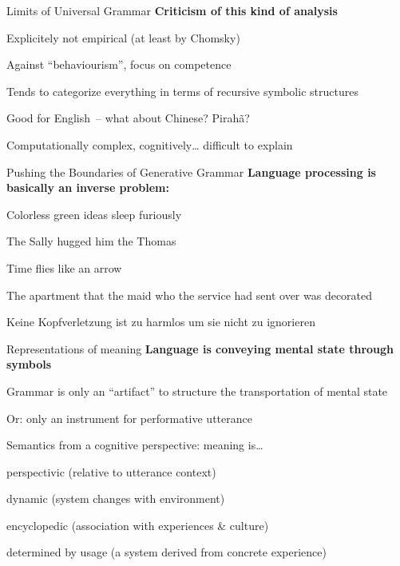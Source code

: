 \documentclass[aspectratio=169,cramped]{beamer}
\let\tempone\itemize
\let\temptwo\enditemize
\renewenvironment{itemize}{\tempone\addtolength{\itemsep}{-0\baselineskip}\addtolength{\parskip}{-0.2\baselineskip}}{\temptwo}
\newcommand{\ex}[1]{{\color{teal} #1}}
\begin{document}
\begin{frame}{Limits of Universal Grammar}
	\textbf{Criticism of this kind of analysis}
  \begin{itemize}
  \item Explicitely not empirical (at least by Chomsky)
    \begin{itemize}
    \item Against ``behaviourism'', focus on competence
    \item Tends to categorize everything in terms of recursive symbolic structures
    \item Good for English~-- what about Chinese? Pirah\~{a}?
    \end{itemize}
  \item Computationally complex, cognitively\ldots{} difficult to explain
  \end{itemize}
\end{frame}

\begin{frame}{Pushing the Boundaries of Generative Grammar}
	\textbf{Language processing is basically an inverse problem:}
  \begin{itemize}
  \item \ex{Colorless green ideas sleep furiously}
  \item \ex{The Sally hugged him the Thomas}
  \item \ex{Time flies like an arrow}
  \item \ex{The apartment that the maid who the service had sent over was decorated}
  \item \ex{Keine Kopfverletzung ist zu harmlos um sie nicht zu ignorieren}
  \end{itemize}
\end{frame}

\begin{frame}{Representations of meaning}
	\textbf{Language is conveying mental state through symbols}
  \begin{itemize}
  \item Grammar is only an ``artifact'' to structure the transportation of mental state
    \begin{itemize}
    \item Or: only an instrument for performative utterance
    \end{itemize}
  \item Semantics from a cognitive perspective: meaning is\ldots
    \begin{itemize}
    \item perspectivic (relative to utterance context)
    \item dynamic (system changes with environment)
    \item encyclopedic (association with experiences \& culture)
    \item determined by usage (a system derived from concrete experience)
    \end{itemize}
  \end{itemize}
\end{frame}
\end{document}
